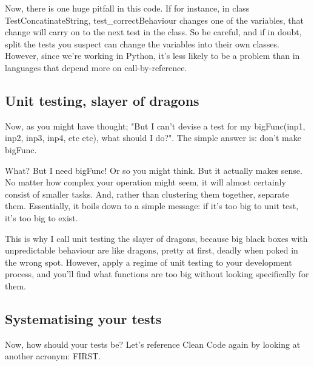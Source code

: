 \documentclass[10pt,a4paper]{article}
\begin{document}
Now, there is one huge pitfall in this code. If for instance, in class TestConcatinateString, test\_correctBehaviour changes one of the variables, that change will carry on to the next test in the class. So be careful, and if in doubt, split the tests you suspect can change the variables into their own classes. However, since we're working in Python, it's less likely to be a problem than in languages that depend more on call-by-reference.  


\subsection{Unit testing, slayer of dragons}
Now, as you might have thought; "But I can't devise a test for my bigFunc(inp1, inp2, inp3, inp4, etc etc), what should I do?". The simple answer is: don't make bigFunc.

What? But I need bigFunc! Or so you might think. But it actually makes sense. No matter how complex your operation might seem, it will almost certainly consist of smaller tasks. And, rather than clustering them together, separate them. Essentially, it boils down to a simple message: if it's too big to unit test, it's too big to exist.

This is why I call unit testing the slayer of dragons, because big black boxes with unpredictable behaviour are like dragons, pretty at first, deadly when poked in the wrong spot. However, apply a regime of unit testing to your development process, and you'll find what functions are too big without looking specifically for them.




\subsection{Systematising your tests}

Now, how should your tests be? Let's reference Clean Code again by looking at another acronym: FIRST.
\end{document}
